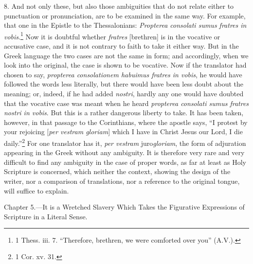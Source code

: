 8. And not only these, but also those ambiguities that do not relate either to punctuation or pronunciation, are to be examined in the same way. For example, that one in the Epistle to the Thessalonians: \emph{Propterea consolati sumus fratres in vobis}.\footnote{1 Thess. iii. 7. “Therefore, brethren, we were comforted over you” (A.V.).} Now it is doubtful whether \emph{ fratres} [brethren] is in the vocative or accusative case, and it is not contrary to faith to take it either way. But in the Greek language the two cases are not the same in form; and accordingly, when we look into the original, the case is shown to be vocative. Now if the translator had chosen to say, \emph{ propterea consolationem habuimus fratres in vobis}, he would have followed the words less literally, but there would have been less doubt about the meaning; or, indeed, if he had added \emph{ nostri}, hardly any one would have doubted that the vocative case was meant when he heard \emph{propterea consolati sumus fratres nostri in vobis}. But this is a rather dangerous liberty to take. It has been taken, however, in that passage to the Corinthians, where the apostle says, “I protest by your  rejoicing [\emph{per vestram gloriam}] which I have in Christ Jesus our Lord, I die daily.”\footnote{1 Cor. xv. 31.} For one translator has it, \emph{ per vestram} juro\emph{gloriam}, the form of adjuration appearing in the Greek without any ambiguity. It is therefore very rare and very difficult to find any ambiguity in the case of proper words, as far at least as Holy Scripture is concerned, which neither the context, showing the design of the writer, nor a comparison of translations, nor a reference to the original tongue, will suffice to explain.


Chapter 5.—It is a Wretched Slavery Which Takes the Figurative Expressions of Scripture in a Literal Sense.

